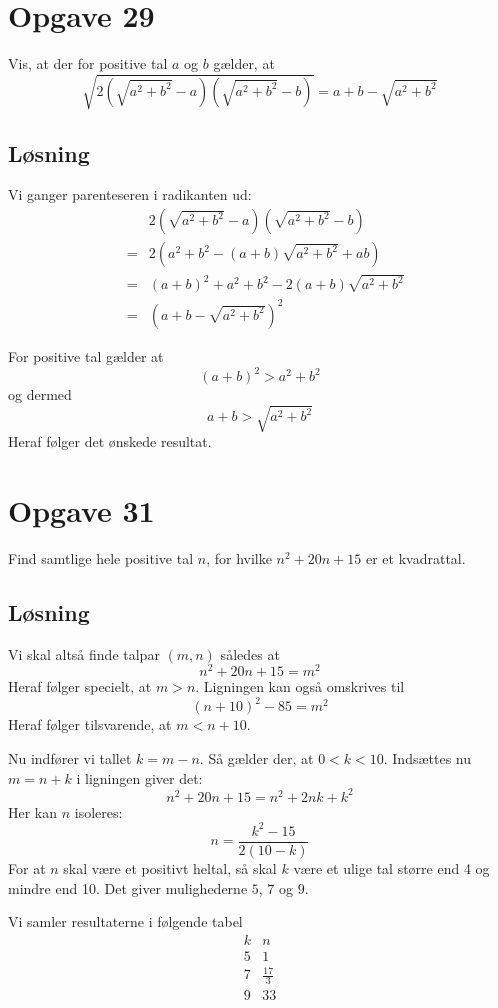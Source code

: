\documentclass[12pt,oneside,a4paper]{article}
\newcommand{\bas}{\begin{eqnarray*}}
\newcommand{\eas}{\end{eqnarray*}}
\begin{document}
\section{Opgave 29}
Vis, at der for positive tal $a$ og $b$ gælder, at
$$
\sqrt{2\left(\sqrt{a^2+b^2}-a\right)\left(\sqrt{a^2+b^2}-b\right)} = a+b-\sqrt{a^2+b^2}
$$

\subsection{Løsning}
Vi ganger parenteseren i radikanten ud:
\bas
&& 2\left(\sqrt{a^2+b^2}-a\right)\left(\sqrt{a^2+b^2}-b\right) \\
&=& 2\left(a^2+b^2-(a+b)\sqrt{a^2+b^2} + ab\right) \\
&=& (a+b)^2 + a^2 + b^2 - 2(a+b)\sqrt{a^2+b^2} \\
&=& \left(a+b - \sqrt{a^2+b^2}\right)^2
\eas

For positive tal gælder at
$$
(a+b)^2 > a^2+b^2
$$
og dermed
$$
a+b > \sqrt{a^2+b^2}
$$
Heraf følger det ønskede resultat.


\section{Opgave 31}
Find samtlige hele positive tal $n$, for hvilke $n^2+20n+15$ er et kvadrattal.

\subsection{Løsning}
Vi skal altså finde talpar $(m,n)$ således at 
$$
n^2+20n+15 = m^2
$$
Heraf følger specielt, at $m>n$.
Ligningen kan også omskrives til
$$
(n+10)^2-85 = m^2
$$
Heraf følger tilsvarende, at $m<n+10$.

Nu indfører vi tallet $k = m-n$. Så gælder der, at $0 < k < 10$. Indsættes nu $m=n+k$ i ligningen giver det:
$$
n^2+20n+15 = n^2+2nk + k^2
$$
Her kan $n$ isoleres:
$$
n = \frac{k^2-15}{2(10-k)}
$$
For at $n$ skal være et positivt heltal, så skal $k$ være et ulige tal større end 4 og mindre end 10. Det giver mulighederne $5$, $7$ og $9$.

Vi samler resultaterne i følgende tabel
$$
\begin{array}{cc}
    k & n \\
    \hline
    5 & 1 \\
    7 & \frac{17}{3} \\
    9 & 33
\end{array}
$$
\end{document}
